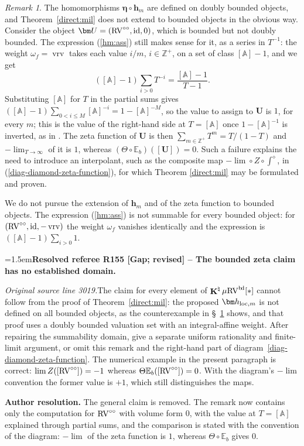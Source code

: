 \documentclass[12pt]{amsart}
\newcommand{\ResolvedRefereeRemark}[5]{%
  \par\medskip\begingroup\normalfont\small\color{gray}%
  \emergencystretch=1.5em\noindent\textbf{Resolved referee R#1 [#2] -- #3.}\par\nobreak\noindent #4\par
  \medskip\color{ResolutionGreen}\noindent\textbf{Author resolution.} #5\par
  \endgroup\medskip
}
\theoremstyle{plain}
\theoremstyle{definition}
\theoremstyle{remark}
\newtheorem{rem}[thm]{Remark}
\numberwithin{equation}{section}
\theoremstyle{plain}
\newcommand{\RV}{\textup{RV}}
\DeclareMathOperator{\id}{id}
\newcommand{\Z}{\mathds{Z}}
\newcommand{\A}{\mathds{A}}
\newcommand{\0}{\emptyset}
\newcommand{\bb}[1]{\mathbb{#1}}
\newcommand{\limplies}{\rightarrow}
\newcommand{\mgRV}{{\mu}{\RV}}
\DeclareMathOperator{\ggk}{\mathbf{K}}
\DeclareMathOperator{\vrv}{vrv}
\DeclareMathOperator{\bdd}{b \! d}
\newcommand{\loc}{\textup{loc}}
\begin{document}
\begin{rem}
\label{sec:hm:bounded}
The homomorphisms $\bm \eta \circ \bm h_m$ are defined on doubly bounded objects, and Theorem~\ref{direct:mil} does not extend to bounded objects in the obvious way. Consider the object $\bm U = (\RV^{\circ\circ}, \id, 0)$, which is bounded but not doubly bounded. The expression (\ref{hm:ass}) still makes sense for it, as a series in $T^{-1}$: the weight $\omega_f = \vrv$ takes each value $i/m$, $i \in \Z^+$, on a set of class $[\A] - 1$, and we get
\[
([\A] - 1) \sum_{i > 0} T^{-i} = \frac{[\A] - 1}{T-1}.
\]
Substituting $[\A]$ for $T$ in the partial sums gives $([\A] - 1) \sum_{0 < i \leq M} [\A]^{-i} = 1 - [\A]^{-M}$, so the value to assign to $\bm U$ is $1$, for every $m$; this is the value of the right-hand side at $T = [\A]$ once $1 - [\A]^{-1}$ is inverted, as in \cite[\S~8.2]{hru:loe:lef}. The zeta function of $\bm U$ is then $\sum_{m \in \Z^+} T^m = T / (1 - T)$ and $- \lim_{T \limplies \infty}$ of it is $1$, whereas $(\Theta \circ \bb E_b)([\bm U]) = 0$. Such a failure explains the need to introduce an interpolant, such as the composite map $- \lim \circ Z \circ \int^\diamond$, in (\ref{diag-diamond-zeta-function}), for which Theorem \ref{direct:mil} may be formulated and proven.

We do not pursue the extension of $\bm h_m$ and of the zeta function to bounded objects. The expression (\ref{hm:ass}) is not summable for every bounded object: for $(\RV^{\circ\circ}, \id, -\vrv)$ the weight $\omega_f$ vanishes identically and the expression is $([\A] - 1) \sum_{i > 0} 1$.

\ResolvedRefereeRemark{155}{Gap; revised}{The bounded zeta claim has no established domain}{%
\textit{Original source line 3019.}\quad The claim for every element of $\ggk^\natural\mgRV^{\bdd}[*]$ cannot follow from the proof of Theorem~\ref{direct:mil}: the proposed $\bm h_{\loc,m}$ is not defined on all bounded objects, as the counterexample in \S~\ref{sec:hm:bounded} shows, and that proof uses a doubly bounded valuation set with an integral-affine weight. After repairing the summability domain, give a separate uniform rationality and finite-limit argument, or omit this remark and the right-hand part of diagram~\eqref{diag-diamond-zeta-function}. The numerical example in the present paragraph is correct: $\lim Z([\RV^{\circ\circ}])=-1$ whereas $\Theta\bb E_b([\RV^{\circ\circ}])=0$. With the diagram's $-\lim$ convention the former value is $+1$, which still distinguishes the maps.
}{The general claim is removed. The remark now contains only the computation for $\RV^{\circ\circ}$ with volume form $0$, with the value at $T = [\A]$ explained through partial sums, and the comparison is stated with the convention of the diagram: $-\lim$ of the zeta function is $1$, whereas $\Theta \circ \bb E_b$ gives $0$.}
\end{rem}
\end{document}
